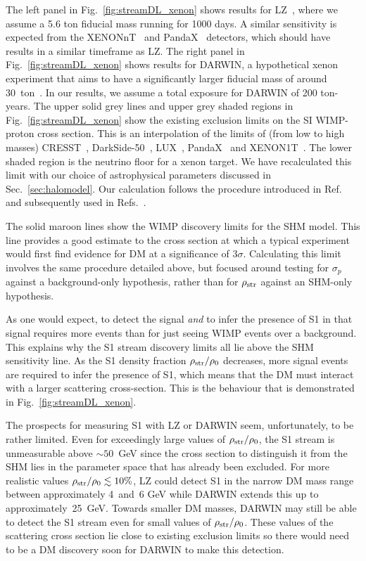 \documentclass[prd,10pt,twocolumn,showpacs,nofootinbib,aps,superscriptaddress,preprintnumbers]{revtex4-1}
\begin{document}
The left panel in Fig.~\ref{fig:streamDL_xenon} shows results for LZ~\cite{Mount:2017qzi}, where we assume a
5.6 ton fiducial mass running for 1000 days. A similar sensitivity is
expected from the XENONnT~\cite{Aprile:2017aty} and PandaX~\cite{Cao:2014jsa} detectors, which should
have results in a similar timeframe as LZ.
The right panel in Fig.~\ref{fig:streamDL_xenon} shows results for DARWIN, a hypothetical xenon experiment
that aims to have a significantly larger fiducial mass of around 30~ton~\cite{Aalbers:2016jon}. 
In our results, we assume a total exposure for DARWIN of 200 ton-years.
The upper solid grey lines and upper grey shaded regions in Fig.~\ref{fig:streamDL_xenon} show
the existing exclusion limits on the SI WIMP-proton cross section.
This is an interpolation of the limits of (from low to high masses) CRESST~\cite{Angloher:2015ewa}, 
DarkSide-50~\cite{Agnes:2018oej}, LUX~\cite{Akerib:2016vxi}, PandaX~\cite{Tan:2016zwf} and XENON1T~\cite{Aprile:2018dbl}.
The lower shaded region is the neutrino floor for a xenon target. 
We have recalculated this limit with our choice of astrophysical parameters discussed in Sec.~\ref{sec:halomodel}.
Our calculation follows the procedure introduced in Ref.~\cite{Billard:2013qya} and subsequently used in Refs.~\cite{Ruppin:2014bra,O'Hare:2015mda,Dent:2016iht,Dent:2016wor,Bertuzzo:2017tuf,OHare:2017rag,Gonzalez-Garcia:2018dep,Gelmini:2018ogy,Boehm:2018sux}.

The solid maroon lines show the WIMP discovery limits for the SHM model. 
This line provides a good estimate to the cross section at which a typical experiment 
would first find evidence for DM at a significance of $3\sigma$. Calculating this limit involves the same procedure detailed above, but focused around testing for $\sigma_p$ against a background-only hypothesis, rather than for $\rho_{\rm str}$ against an SHM-only hypothesis. 

As one would expect, to detect the signal \emph{and} to infer the presence of S1 in that signal requires more events than for just seeing WIMP events over a background. This explains why the S1 stream discovery limits all lie above the SHM sensitivity line.
As the S1 density fraction $\rho_{\rm str}/\rho_0$ decreases, more signal events are required
to infer the presence of S1, which means that the DM must interact with a larger scattering
cross-section. This is the behaviour that is demonstrated in Fig.~\ref{fig:streamDL_xenon}.

The prospects for measuring S1 with LZ or DARWIN seem, unfortunately, to be rather limited.
Even for exceedingly large values of $\rho_{\rm str}/\rho_0$, the S1 stream is
unmeasurable above $\sim50$~GeV since the cross section
 to distinguish it from the SHM
lies in the parameter space that has already been excluded.
For more realistic values $\rho_{\rm str}/\rho_0\lesssim10\%$, LZ could 
detect S1 in the narrow DM mass range between approximately 4~and~6 GeV
while DARWIN extends this up to approximately~25~GeV. Towards smaller DM masses,  DARWIN may still be able to detect the S1 stream 
even for small values of $\rho_{\rm str}/\rho_0$. These values of the scattering cross section lie close to existing exclusion 
limits so there would need to be a DM discovery soon for DARWIN to make this detection.
\end{document}

